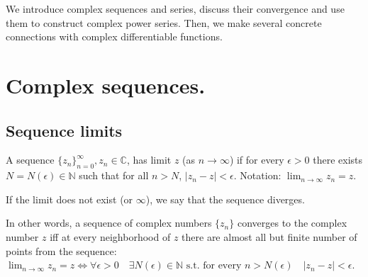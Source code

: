 
% 
% 
% 
% 
% 
% 
% 
% 
% 
% 
% 

\graphicspath{{./input/graphs/note05/}}


% 



We introduce complex sequences and series, discuss their convergence and use them to construct complex power series. Then, we make several concrete connections with complex differentiable functions.

\section{Complex sequences.}

\subsection{Sequence limits}

\begin{definition}\label{definition:10.1} A sequence $\{z_n\}_{n=0}^{\infty}, z_n \in \mathbb{C}$, has limit $z$ (as $n \to \infty$) if for every $\epsilon > 0$ there exists $N = N(\epsilon) \in \mathbb{N}$ such that for all $n > N$, $|z_n - z| < \epsilon$. Notation: $\lim_{n \to \infty} z_n = z$.
\end{definition}
If the limit does not exist (or $\infty$), we say that the sequence diverges.

In other words, a sequence of complex numbers $\{z_n\}$ converges to the complex number $z$ iff at every neighborhood of $z$ there are almost all but finite number of points from the sequence: $\lim_{n \to \infty} z_n = z \iff \forall \epsilon > 0 \quad \exists N(\epsilon) \in \mathbb{N} \text{ s.t. for every } n > N(\epsilon) \quad |z_n - z| < \epsilon$.

